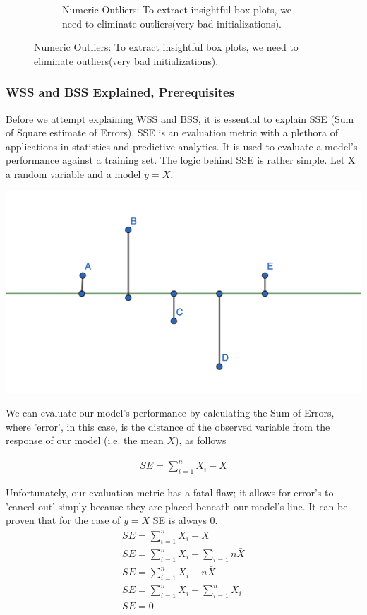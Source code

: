 \documentclass[11pt]{article}
\begin{document}
\begin{figure}[H]
\begin{subfigure}{0.35\textwidth}
					\caption{Numeric Outliers: To extract insightful box plots, we need to eliminate outliers(very bad initializations).}
					\label{fig:first}
				\end{subfigure}
					\label{fig:figures}
			\end{figure}
			\fi
			
			\subsubsection*{WSS and BSS Explained, Prerequisites}
				Before we attempt explaining WSS and BSS, it is essential to explain SSE (Sum of Square estimate of Errors). SSE is an evaluation metric with a plethora of applications in statistics and predictive analytics\cite{sse}. It is used to evaluate a model's performance against a training set. The logic behind SSE is rather simple. Let X a random variable and a model $y=\bar{X}$.
				\iftrue
				\begin{center}
					\includegraphics[scale=0.5]{res/t1/t15/t15-SSE}				
				\end{center}
				\fi
				We can evaluate our model's performance by calculating the Sum of Errors, where 'error', in this case, is the distance of the observed variable from the response of our model (i.e. the mean $\bar{X}$), as follows
				\iftrue
				\begin{align}
					SE = \sum_{i=1}^{n}{X_i-\bar{X}}
				\end{align}
				\fi
				Unfortunately, our evaluation metric has a fatal flaw; it allows for error's to 'cancel out' simply because they are placed beneath our model's line. It can be proven that for the case of $y=\bar{X}$ SE is always 0.
				\iftrue
				\begin{align}
					SE = \sum_{i=1}^{n}{X_i-\bar{X}} \\
					SE = \sum_{i=1}^{n}{X_i} - \sum_{i=1}{n}{\bar{X}} \\
					SE = \sum_{i=1}^{n}{X_i} - n\bar{X} \\
					SE = \sum_{i=1}^{n}{X_i} - \sum_{i=1}^{n}{X_i} \\
					SE = 0 \\
				\end{align}
\end{document}

